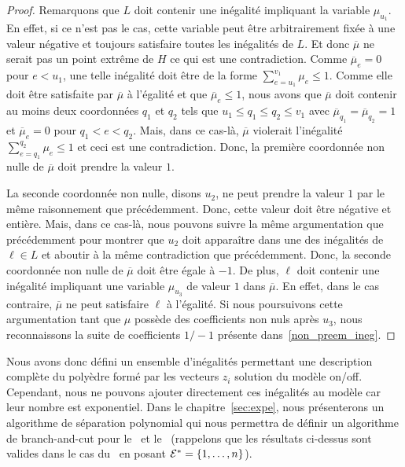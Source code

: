 \begin{proof}
  Remarquons que $L$ doit contenir une inégalité impliquant la
  variable $\mu_{u_1}$. En effet, si ce n'est pas le cas, cette variable
  peut être arbitrairement fixée à une valeur négative et toujours
  satisfaire toutes les inégalités de $L$. Et donc $\overline{\mu}$ ne
  serait pas un point extrême de $H$ ce qui est une contradiction. Comme
  $\overline{\mu}_e=0$ pour $e< u_1$, une telle inégalité doit être de
  la forme $ \sum_{e=u_1}^{v_1} \mu _e \le 1$. Comme elle doit être
  satisfaite par $\overline{\mu}$ à l'égalité et que $\overline{\mu}_e
  \le 1$, nous avons que $\overline{\mu}$ doit contenir au moins deux
  coordonnées $q_1$ et $q_2$ tels que $ u_1 \le q_1 \le q_2 \le v_1$
  avec $\overline{\mu}_{q_1}=\overline{\mu}_{q_2}=1$ et
  $\overline{\mu}_{e}=0$ pour $q_1 < e < q_2$. Mais, dans ce cas-là,
  $\overline{\mu}$ violerait l'inégalité $\sum_{e=q_1}^{q_2} \mu_e \le
  1$ et ceci est une contradiction. Donc, la première coordonnée non
  nulle de $\overline{\mu}$ doit 
  prendre la valeur $1$. 
  
  La seconde coordonnée non nulle, disons
  $u_2$, ne peut prendre la valeur $1$ par le même raisonnement que
  précédemment. Donc, cette valeur doit être négative et
  entière. Mais, dans ce cas-là, nous pouvons suivre la même
  argumentation que précédemment pour montrer que $u_2$ doit
  apparaître dans une des inégalités de $\ell \in L$ et aboutir à la même
  contradiction que précédemment. Donc, la seconde coordonnée non nulle
  de $\overline{\mu}$ doit être égale à $-1$. De plus, $\ell$ doit
  contenir une inégalité impliquant une variable $\mu_{u_3}$ de valeur
  $1$ dans $\overline{\mu}$. En effet, dans le cas contraire,
  $\overline{\mu}$ ne peut satisfaire $\ell$ à l'égalité. Si nous
  poursuivons cette argumentation tant que $\mu$ possède des
  coefficients non nuls après $u_3$, nous reconnaissons la suite de
coefficients $1/-1$ présente dans~\eqref{non_preem_ineg}.
\end{proof}

Nous avons donc défini un ensemble d'inégalités permettant une
description complète du polyèdre formé par les vecteurs $z_i$ solution
du modèle on/off. Cependant, nous ne pouvons ajouter directement ces
inégalités au modèle car leur nombre est exponentiel. Dans le
chapitre~\ref{sec:expe}, nous présenterons un algorithme de 
séparation polynomial qui nous permettra de définir un algorithme de
branch-and-cut pour le \CECSP~et le \RCPSP~(rappelons que les
résultats ci-dessus sont valides dans le cas du \RCPSP~en posant
${\cal E}^*=\{1,\dots,n\}$). 

